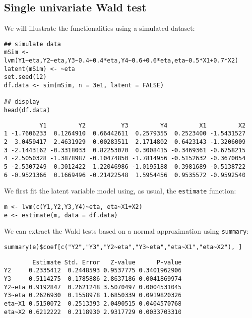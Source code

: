 \documentclass[12pt]{article}
\begin{document}
\subsection{Single univariate Wald test}
\label{sec:org585b66b}

We will illustrate the functionalities using a simulated dataset:
\lstset{language=r,label= ,caption= ,captionpos=b,numbers=none}
\begin{lstlisting}
## simulate data
mSim <- lvm(Y1~eta,Y2~eta,Y3~0.4+0.4*eta,Y4~0.6+0.6*eta,eta~0.5*X1+0.7*X2)
latent(mSim) <- ~eta
set.seed(12)
df.data <- sim(mSim, n = 3e1, latent = FALSE)

## display
head(df.data)
\end{lstlisting}

\begin{verbatim}
          Y1         Y2          Y3         Y4         X1         X2
1 -1.7606233  0.1264910  0.66442611  0.2579355  0.2523400 -1.5431527
2  3.0459417  2.4631929  0.00283511  2.1714802  0.6423143 -1.3206009
3 -2.1443162 -0.3318033  0.82253070  0.3008415 -0.3469361 -0.6758215
4 -2.5050328 -1.3878987 -0.10474850 -1.7814956 -0.5152632 -0.3670054
5 -2.5307249  0.3012422  1.22046986 -1.0195188  0.3981689 -0.5138722
6 -0.9521366  0.1669496 -0.21422548  1.5954456  0.9535572 -0.9592540
\end{verbatim}

We first fit the latent variable model using, as usual, the \texttt{estimate}
function:
\lstset{language=r,label= ,caption= ,captionpos=b,numbers=none}
\begin{lstlisting}
m <- lvm(c(Y1,Y2,Y3,Y4)~eta, eta~X1+X2)
e <- estimate(m, data = df.data)
\end{lstlisting}

We can extract the Wald tests based on a normal approximation using
\texttt{summary}:
\lstset{language=r,label= ,caption= ,captionpos=b,numbers=none}
\begin{lstlisting}
summary(e)$coef[c("Y2","Y3","Y2~eta","Y3~eta","eta~X1","eta~X2"), ]
\end{lstlisting}

\begin{verbatim}
        Estimate Std. Error   Z-value      P-value
Y2     0.2335412  0.2448593 0.9537775 0.3401962906
Y3     0.5114275  0.1785886 2.8637186 0.0041869974
Y2~eta 0.9192847  0.2621248 3.5070497 0.0004531045
Y3~eta 0.2626930  0.1558978 1.6850339 0.0919820326
eta~X1 0.5150072  0.2513393 2.0490515 0.0404570768
eta~X2 0.6212222  0.2118930 2.9317729 0.0033703310
\end{verbatim}
\end{document}
